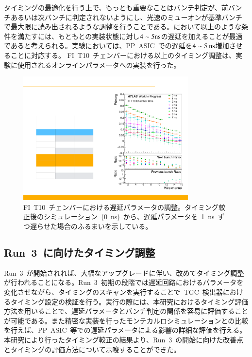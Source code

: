タイミングの最適化を行う上で、もっとも重要なことはバンチ判定が、前バンチあるいは次バンチに判定されないようにし、光速のミューオンが基準バンチで最大限に読み出されるような調整を行うことである。において以上のような条件を満たすには、もともとの実装状態に対し$4\sim5\rm{ns}$の遅延を加えることが最適であると考えられる。実験においては、PP~ASIC~での遅延を$4\sim5~\rm{ns}$増加させることに対応する。
FI~T10~チェンバーにおける以上のタイミング調整は、実験に使用されるオンラインパラメータへの実装を行った。
\begin{figure}[H]
    \centering   
    \includegraphics[width=0.8\textwidth,page=1]{img/plot/FItune.pdf}
    \caption[FI T10 チェンバーにおける遅延パラメータの調整]{FI~T10~チェンバーにおける遅延パラメータの調整。タイミング較正後のシミュレーション~(0~ns)~から、遅延パラメータを~1~ns~ずつ遅らせた場合のふるまいを示している。}
    \label{fig:fitune}
\end{figure}

\subsection{Run~3~に向けたタイミング調整}
Run~3~が開始されれば、大幅なアップグレードに伴い、改めてタイミング調整が行われることになる。Run~3~初期の段階では遅延回路におけるパラメータを変化させながら、タイミングのスキャンを実行することで~TGC~検出器におけるタイミング設定の検証を行う。実行の際には、本研究におけるタイミング評価方法を用いることで、遅延パラメータとバンチ判定の関係を容易に評価することが可能である。また精密な実装を行ったモンテカルロシミュレーションとの比較を行えば、PP~ASIC~等での遅延パラメータによる影響の詳細な評価を行える。
本研究により行ったタイミング較正の結果より、Run~3~の開始に向けた改善点とタイミングの評価方法について示唆することができた。
